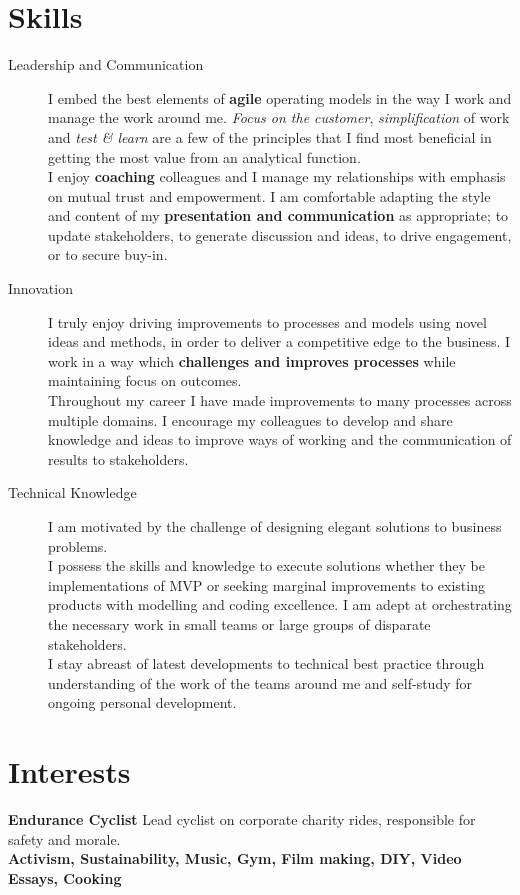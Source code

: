 \documentclass[11pt]{article}
\begin{document}
\section*{Skills}
\begin{description}
\item[Leadership and Communication] I embed the best elements of \textbf{agile} operating models in the way I work and manage the work around me.  \emph{Focus on the customer}, \emph{simplification} of work and \emph{test \& learn} are a few of the principles that I find most beneficial in getting the most value from an analytical function.\\
I enjoy \textbf{coaching} colleagues and I manage my relationships with emphasis on mutual trust and empowerment.
I am comfortable adapting the style and content of my \textbf{presentation and communication} as appropriate; to update stakeholders, to generate discussion and ideas, to drive engagement, or to secure buy-in. 
\item[Innovation] I truly enjoy driving improvements to processes and models using novel ideas and methods, in order to deliver a competitive edge to the business. 
I work in a way which \textbf{challenges and improves processes} while maintaining focus on outcomes.\\
Throughout my career I have made improvements to many processes across multiple domains. I encourage my colleagues to develop and share knowledge and ideas to improve ways of working and the communication of results to stakeholders.
\item[Technical Knowledge] I am motivated by the challenge of designing elegant solutions to business problems.\\I possess the skills and knowledge to execute solutions whether they be implementations of MVP or seeking marginal improvements to existing products with modelling and coding excellence. I am adept at orchestrating the necessary work in small teams or large groups of disparate stakeholders.\\
I stay abreast of latest developments to technical best practice through understanding of the work of the teams around me and self-study for ongoing personal development.\\
\end{description} 

\section*{Interests}

\textbf{Endurance Cyclist} Lead cyclist on corporate charity rides, responsible for safety and morale.\\
\textbf{Activism, Sustainability, Music, Gym, Film making,  DIY, Video Essays, Cooking}
\end{document}
